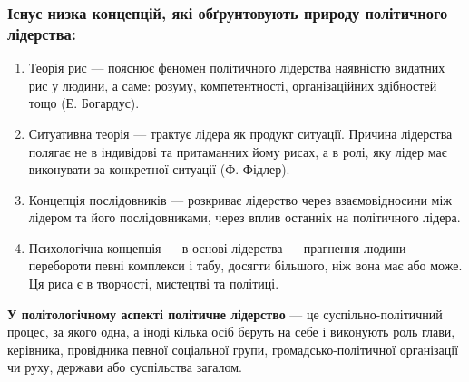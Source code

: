 \subsubsection{Існує низка концепцій, які обґрунтовують природу політичного лідерства:}
\begin{enumerate}
\item Теорія рис — пояснює феномен політичного лідерства наявністю видатних рис у людини, а саме: розуму, компетентності, організаційних здібностей тощо (Е. Богардус).
\item Ситуативна теорія — трактує лідера як продукт ситуації. Причина лідерства полягає не в індивідові та притаманних йому рисах, а в ролі, яку лідер має виконувати за конкретної ситуації (Ф. Фідлер).
\item Концепція послідовників — розкриває лідерство через взаємовідносини між лідером та його послідовниками, через вплив останніх на політичного лідера.
\item Психологічна концепція — в основі лідерства — прагнення людини перебороти певні комплекси і табу, досягти більшого, ніж вона має або може. Ця риса є в творчості, мистецтві та політиці.
\end{enumerate}
\textbf{У політологічному аспекті політичне лідерство} — це суспільно-політичний процес, за якого одна, а іноді кілька осіб беруть на себе і виконують роль глави, керівника, провідника певної соціальної групи, громадсько-політичної організації чи руху, держави або суспільства загалом.
